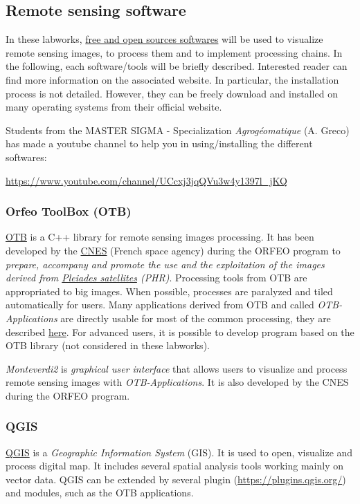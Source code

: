 \documentclass[a4paper,11pt,DIV=18]{scrartcl}
\begin{document}
\subsection{Remote sensing software}
\label{sec:org127f113}
In these  labworks, \href{https://www.fsf.org/}{free and  open sources  softwares} will be  used to
visualize  remote sensing  images, to  process them  and to  implement
processing  chains.  In  the  following, each  software/tools will  be
briefly described.  Interested reader can find more information on the
associated website.   In particular,  the installation process  is not
detailed. However, they  can be freely download and  installed on many
operating systems from their official website.

Students  from  the  MASTER   SIGMA  -  Specialization  \emph{Agrogéomatique}
(A. Greco) has made a youtube  channel to help you in using/installing
the                        different                        softwares:
\begin{center}
\url{https://www.youtube.com/channel/UCcxj3jqQVu3w4y1397l\_jKQ}
\end{center}

\subsubsection{Orfeo ToolBox (OTB)}
\label{sec:org3a230ec}
\href{https://www.orfeo-toolbox.org/}{OTB} is a C++ library for remote sensing images processing. It has been
developed by the  \href{https://cnes.fr/en}{CNES} (French space agency) during  the ORFEO program
to \emph{prepare, accompany and promote the use and the exploitation of the
images derived from \href{https://en.wikipedia.org/wiki/Pleiades\_\%28satellite\%29}{Pleiades satellites} (PHR)}.  Processing tools from
OTB  are appropriated  to big  images.  When  possible, processes  are
paralyzed and tiled automatically for users. Many applications derived
from OTB and  called \emph{OTB-Applications} are directly usable  for most of
the common processing, they are described \href{https://www.orfeo-toolbox.org/CookBook/CookBook.html}{here}. For advanced users, it
is  possible  to  develop  program  based  on  the  OTB  library  (not
considered in these labworks).

\emph{Monteverdi2} is \emph{graphical user interface} that allows users to visualize
and process  remote sensing images  with \emph{OTB-Applications}. It  is also
developed by the CNES during the ORFEO program.

\subsubsection{QGIS}
\label{sec:orgff45480}
\href{http://www.qgis.org/en/site/}{QGIS} is  a \emph{Geographic Information System}  (GIS).  It is used  to open,
visualize  and  process  digital  map.  It  includes  several  spatial
analysis tools working mainly on vector  data. QGIS can be extended by
several plugin  (\url{https://plugins.qgis.org/}) and  modules, such  as the
OTB applications.
\end{document}
